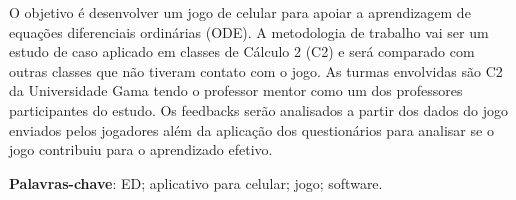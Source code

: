 \begin{resumo}

	O objetivo é desenvolver um jogo de celular para apoiar a aprendizagem de equações diferenciais ordinárias (ODE). A metodologia de trabalho vai ser um estudo de caso aplicado em classes de Cálculo 2 (C2) e será comparado com outras classes que não tiveram contato com o jogo. As turmas envolvidas são C2 da Universidade Gama tendo o professor mentor como um dos professores participantes do estudo. Os feedbacks serão analisados a partir dos dados do jogo enviados pelos jogadores além da aplicação dos questionários para analisar se o jogo contribuiu para o aprendizado efetivo.
	
\begin{comment}
 Com a qualidade de ensino de matemática baixa e contra os métodos muito
 tradicionais de ensino nas salas de aula, resolveu-se desenvolver um 
 aplicativo para celular (iOS e Android) que seja um jogo para o suporte de 
 ensino de equações diferenciais (ED). Será realizada uma pesquisa descritiva
 para o levantamento bibliográfico das características que deverão estar presentes
 no software para dar auxílio a alunos com TDAH junto de técnicas de gamificação 
 para tentar deixar o aprendizado mais prazeroso.
\end{comment}
  
 \begin{comment}
 O resumo deve ressaltar o objetivo, o método, os resultados e as conclusões 
 do documento. A ordem e a extensão
 destes itens dependem do tipo de resumo (informativo ou indicativo) e do
 tratamento que cada item recebe no documento original. O resumo deve ser
 precedido da referência do documento, com exceção do resumo inserido no
 próprio documento. (\ldots) As palavras-chave devem figurar logo abaixo do
 resumo, antecedidas da expressão Palavras-chave:, separadas entre si por
 ponto e finalizadas também por ponto. O texto pode conter no mínimo 150 e 
 no máximo 500 palavras, é aconselhável que sejam utilizadas 200 palavras. 
 E não se separa o texto do resumo em parágrafos.
 \end{comment}

 \vspace{\onelineskip}
    
 \noindent
 \textbf{Palavras-chave}: ED; aplicativo para celular; jogo; software.
\end{resumo}
